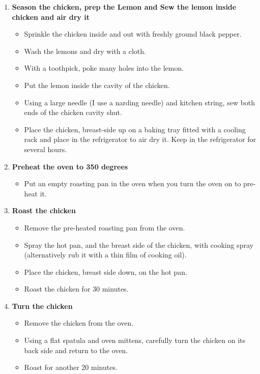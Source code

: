 \documentclass[11pt,letterpaper]{article}
\begin{document}
\begin {description}
\begin{enumerate}
\item {\bf Season the chicken, prep the Lemon and Sew the lemon inside chicken and air dry it}
\begin{itemize}
\item Sprinkle the chicken inside and out with freshly ground black pepper.
\item Wash the lemons and dry with a cloth.
\item With a toothpick, poke many holes into the lemon.
\item Put the lemon inside the cavity of the chicken.
\item Using a large needle (I use a narding needle) and kitchen string, sew both ends of the chicken cavity shut.
\item Place the chicken, breast-side up on a baking tray fitted with a cooling rack and place in the refrigerator to air dry it. Keep in the refrigerator for several hours.
\end{itemize}

\item{\bf Preheat the oven to 350 degrees}
\begin{itemize}
\item Put an empty roasting pan in the oven when you turn the oven on to pre-heat it. 
\end{itemize}

\item{\bf Roast the chicken}
\begin{itemize}
\item Remove the pre-heated roasting pan from the oven. 
\item Spray the hot pan, and the breast side of the chicken, with cooking spray (alternatively rub it with a thin film of cooking oil).
\item Place the chicken, breast side down, on the hot pan.
\item Roast the chicken for 30 minutes.
\end{itemize}

\item{\bf Turn the chicken}
\begin{itemize}
\item Remove the chicken from the oven.
\item Using a flat spatula and oven mittens, carefully turn the chicken on its back side and return to the oven.
\item Roast for another 20 minutes.
\end{itemize}


\end{enumerate}
\end{description}
\end{document}
